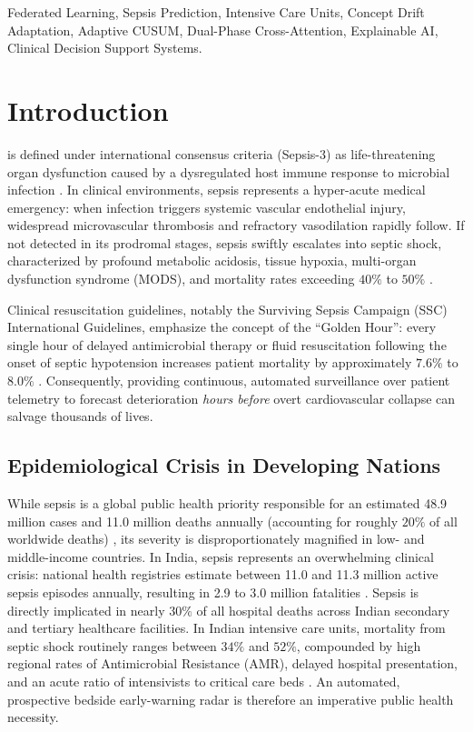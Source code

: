\documentclass[journal,twocolumn,10pt]{IEEEtran}
\begin{document}
\begin{IEEEkeywords}
Federated Learning, Sepsis Prediction, Intensive Care Units, Concept Drift Adaptation, Adaptive CUSUM, Dual-Phase Cross-Attention, Explainable AI, Clinical Decision Support Systems.
\end{IEEEkeywords}

\section{Introduction}
 is defined under international consensus criteria (Sepsis-3) as life-threatening organ dysfunction caused by a dysregulated host immune response to microbial infection \cite{singer2016sepsis3}. In clinical environments, sepsis represents a hyper-acute medical emergency: when infection triggers systemic vascular endothelial injury, widespread microvascular thrombosis and refractory vasodilation rapidly follow. If not detected in its prodromal stages, sepsis swiftly escalates into septic shock, characterized by profound metabolic acidosis, tissue hypoxia, multi-organ dysfunction syndrome (MODS), and mortality rates exceeding $40\%$ to $50\%$ \cite{evans2021surviving,dusing2025sepsis}. 

Clinical resuscitation guidelines, notably the Surviving Sepsis Campaign (SSC) International Guidelines, emphasize the concept of the ``Golden Hour'': every single hour of delayed antimicrobial therapy or fluid resuscitation following the onset of septic hypotension increases patient mortality by approximately $7.6\%$ to $8.0\%$ \cite{evans2021surviving}. Consequently, providing continuous, automated surveillance over patient telemetry to forecast deterioration \textit{hours before} overt cardiovascular collapse can salvage thousands of lives.

\subsection{Epidemiological Crisis in Developing Nations}
While sepsis is a global public health priority responsible for an estimated 48.9 million cases and 11.0 million deaths annually (accounting for roughly $20\%$ of all worldwide deaths) \cite{rudd2020global}, its severity is disproportionately magnified in low- and middle-income countries. In India, sepsis represents an overwhelming clinical crisis: national health registries estimate between 11.0 and 11.3 million active sepsis episodes annually, resulting in 2.9 to 3.0 million fatalities \cite{chatterjee2020india,kalakoti2025fedxai}. Sepsis is directly implicated in nearly $30\%$ of all hospital deaths across Indian secondary and tertiary healthcare facilities. In Indian intensive care units, mortality from septic shock routinely ranges between $34\%$ and $52\%$, compounded by high regional rates of Antimicrobial Resistance (AMR), delayed hospital presentation, and an acute ratio of intensivists to critical care beds \cite{chatterjee2020india}. An automated, prospective bedside early-warning radar is therefore an imperative public health necessity.
\end{document}
